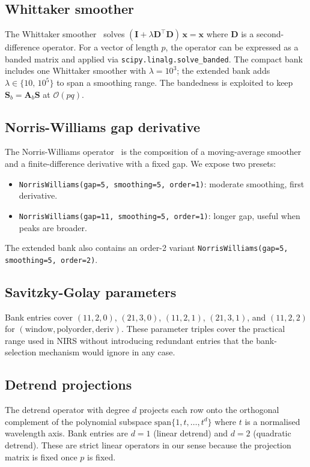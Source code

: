 \documentclass[a4paper,11pt]{article}
\newcommand{\identity}{\mathbf{I}}
\newcommand{\Amat}{\mathbf{A}}
\newcommand{\Smat}{\mathbf{S}}
\newcommand{\xvec}{\mathbf{x}}
\begin{document}
\subsection{Whittaker smoother}
The Whittaker smoother~\cite{eilers2003perfect} solves
$(\identity+\lambda \mathbf{D}^\top \mathbf{D})\,\xvec=\xvec$ where
$\mathbf{D}$ is a second-difference operator. For a vector of length
$p$, the operator can be expressed as a banded matrix and applied via
\texttt{scipy.linalg.solve\_banded}. The compact bank includes one
Whittaker smoother with $\lambda=10^{3}$; the extended bank adds
$\lambda\in\{10,\,10^5\}$ to span a smoothing range. The bandedness is
exploited to keep $\Smat_b=\Amat_b\Smat$ at $\mathcal{O}(pq)$.

\subsection{Norris-Williams gap derivative}
The Norris-Williams operator~\cite{norris1976influence} is the
composition of a moving-average smoother and a finite-difference
derivative with a fixed gap. We expose two presets:
\begin{itemize}[leftmargin=2em]
  \item \texttt{NorrisWilliams(gap=5, smoothing=5, order=1)}: moderate
        smoothing, first derivative.
  \item \texttt{NorrisWilliams(gap=11, smoothing=5, order=1)}: longer
        gap, useful when peaks are broader.
\end{itemize}
The extended bank also contains an order-2 variant
\texttt{NorrisWilliams(gap=5, smoothing=5, order=2)}.

\subsection{Savitzky-Golay parameters}
Bank entries cover $(11,2,0)$, $(21,3,0)$, $(11,2,1)$, $(21,3,1)$, and
$(11,2,2)$ for $(\text{window},\text{polyorder},\text{deriv})$. These
parameter triples cover the practical range used in NIRS without
introducing redundant entries that the bank-selection mechanism would
ignore in any case.

\subsection{Detrend projections}
The detrend operator with degree $d$ projects each row onto the
orthogonal complement of the polynomial subspace
$\mathrm{span}\{1,t,\dots,t^d\}$ where $t$ is a normalised wavelength
axis. Bank entries are $d=1$ (linear detrend) and $d=2$ (quadratic
detrend). These are strict linear operators in our sense because the
projection matrix is fixed once $p$ is fixed.
\end{document}
